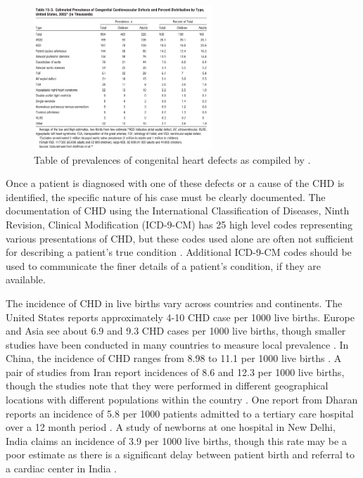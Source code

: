 \begin{figure}
\centering
\includegraphics[width=0.6\textwidth]{5/chd-defects-usa.png}
\caption{Table of prevalences of congenital heart defects as compiled by \cite{Mozaffarian2016}.}
\label{ch5:fig:usa-defects-prev}
\end{figure}

Once a patient is diagnosed with one of these defects or a cause of the CHD is identified, the specific nature of his case must be clearly documented. The documentation of CHD using the International Classification of Diseases, Ninth Revision, Clinical Modification (ICD-9-CM) has 25 high level codes representing various presentations of CHD, but these codes used alone are often not sufficient for describing a patient's true condition \cite{Mozaffarian2016}. Additional ICD-9-CM codes should be used to communicate the finer details of a patient's condition, if they are available. %

The incidence of CHD in live births vary across countries and continents. The United States reports approximately 4-10 CHD case per 1000 live births. Europe and Asia see about 6.9 and 9.3 CHD cases per 1000 live births, though smaller studies have been conducted in many countries to measure local prevalence \cite{Mozaffarian2016}. In China, the incidence of CHD ranges from 8.98 to 11.1 per 1000 live births \cite{Zhao2019} \cite{Qu2016}. 
A pair of studies from Iran report incidences of 8.6 and 12.3 per 1000 live births, though the studies note that they were performed in different geographical locations with different populations within the country \cite{Nikyar2011} \cite{Rahim2008}.
One report from Dharan reports an incidence of 5.8 per 1000 patients admitted to a tertiary care hospital over a 12 month period \cite{Shah2008}. A study of newborns at one hospital in New Delhi, India claims an incidence of 3.9 per 1000 live births, though this rate may be a poor estimate as there is a significant delay between patient birth and referral to a cardiac center in India \cite{Khalil1994} \cite{Saxena2005}.

